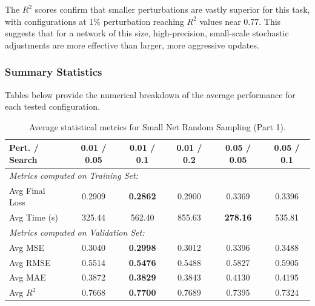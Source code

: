 The $R^2$ scores confirm that smaller perturbations are vastly superior for this task, with configurations at $1\%$ perturbation reaching $R^2$ values near $0.77$. This suggests that for a network of this size, high-precision, small-scale stochastic adjustments are more effective than larger, more aggressive updates.

\subsubsection{Summary Statistics}

Tables below provide the numerical breakdown of the average performance for each tested configuration.

\begin{table}[h]
\centering
\scriptsize
\begin{tabular}{|l|c|c|c|c|c|}
\hline
\textbf{Pert. / Search} & \textbf{0.01 / 0.05} & \textbf{0.01 / 0.1} & \textbf{0.01 / 0.2} & \textbf{0.05 / 0.05} & \textbf{0.05 / 0.1} \\ \hline
\multicolumn{6}{|l|}{\textit{Metrics computed on Training Set:}} \\ \hline
Avg Final Loss & 0.2909 & \textbf{0.2862} & 0.2900 & 0.3369 & 0.3396 \\ \hline
Avg Time (s)   & 325.44 & 562.40 & 855.63 & \textbf{278.16} & 535.81 \\ \hline
\multicolumn{6}{|l|}{\textit{Metrics computed on Validation Set:}} \\ \hline
Avg MSE        & 0.3040 & \textbf{0.2998} & 0.3012 & 0.3396 & 0.3488 \\ \hline
Avg RMSE       & 0.5514 & \textbf{0.5476} & 0.5488 & 0.5827 & 0.5905 \\ \hline
Avg MAE        & 0.3872 & \textbf{0.3829} & 0.3843 & 0.4130 & 0.4195 \\ \hline
Avg $R^2$      & 0.7668 & \textbf{0.7700} & 0.7689 & 0.7395 & 0.7324 \\ \hline
\end{tabular}
\caption{Average statistical metrics for Small Net Random Sampling (Part 1).}
\label{tab:small_net_random_part1}
\end{table}


